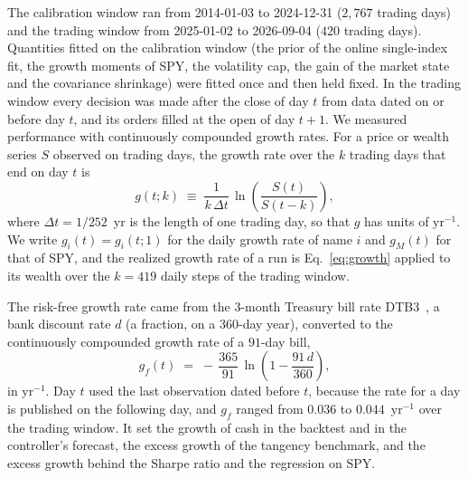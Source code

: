 The calibration window ran from 2014-01-03 to 2024-12-31 ($2{,}767$ trading days) and the trading window from
2025-01-02 to 2026-09-04 ($420$ trading days). Quantities fitted on the calibration window (the prior of the online
single-index fit, the growth moments of SPY, the volatility cap, the gain of the market state and the covariance
shrinkage) were fitted once and then held fixed. In the trading window every decision was made after the close of
day $t$ from data dated on or before day $t$, and its orders filled at the open of day $t+1$. We measured
performance with continuously compounded growth rates. For a price or wealth series $S$ observed on trading days,
the growth rate over the $k$ trading days that end on day $t$ is
\begin{equation}
  g(t;k) \;\equiv\; \frac{1}{k\,\Delta t}\,\ln\!\left(\frac{S(t)}{S(t-k)}\right),
  \label{eq:growth}
\end{equation}
where $\Delta t = 1/252$~yr is the length of one trading day, so that $g$ has units of $\mathrm{yr}^{-1}$. We write
$g_i(t) = g_i(t;1)$ for the daily growth rate of name $i$ and $g_M(t)$ for that of SPY, and the realized growth rate
of a run is Eq.~\eqref{eq:growth} applied to its wealth over the $k = 419$ daily steps of the trading window.

The risk-free growth rate came from the 3-month Treasury bill rate DTB3~\cite{fredDTB3}, a bank discount rate $d$
(a fraction, on a 360-day year), converted to the continuously compounded growth rate of a $91$-day bill,
\begin{equation}
  g_f(t) \;=\; -\,\frac{365}{91}\,\ln\!\left(1 - \frac{91\,d}{360}\right),
  \label{eq:riskfree}
\end{equation}
in $\mathrm{yr}^{-1}$. Day $t$ used the last observation dated before $t$, because the rate for a day is published
on the following day, and $g_f$ ranged from $0.036$ to $0.044$~$\mathrm{yr}^{-1}$ over the trading window. It set
the growth of cash in the backtest and in the controller's forecast, the excess growth of the tangency
benchmark, and the excess growth behind the Sharpe ratio and the regression on SPY.

